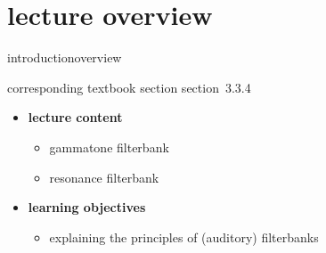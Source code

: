 


\subtitle{module 3.3.4: time-frequency representations~---~filterbanks}


	

    \section[overview]{lecture overview}
        \begin{frame}{introduction}{overview}
            \begin{block}{corresponding textbook section}
                    section~3.3.4
            \end{block}

            \begin{itemize}
                \item   \textbf{lecture content}
                    \begin{itemize}
                        \item   gammatone filterbank
                        \item   resonance filterbank
                    \end{itemize}
                \bigskip
                \item<2->   \textbf{learning objectives}
                    \begin{itemize}
                        \item   explaining the principles of (auditory) filterbanks
                    \end{itemize}
            \end{itemize}
        \end{frame}
        
